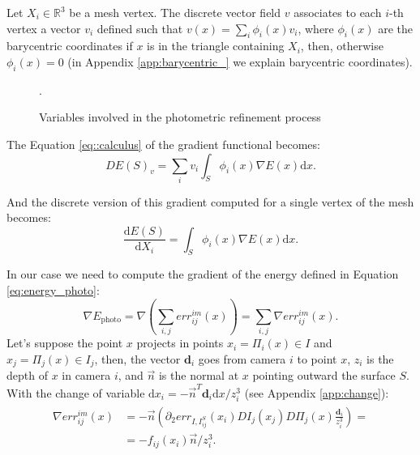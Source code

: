 Let $X_i \in \mathbb{R}^3$ be a mesh vertex. The discrete vector field $v$ associates to each $i$-th vertex a vector $v_i$ defined such that $v(x) = \sum_i \phi_i(x) v_i$, where $\phi_i(x)$ are the barycentric coordinates if $x$ is in the triangle containing $X_i$, then,  otherwise $\phi_i(x) = 0$ (in Appendix \ref{app:barycentric_} we explain barycentric coordinates).



\begin{figure}[t]
\centering
  \def\svgwidth{200pt}
  
\caption{Variables involved in the photometric refinement process}.
\label{fig:cameraproj}
\end{figure}

The Equation \eqref{eq::calculus} of the gradient functional becomes:
\begin{equation}
  DE(\mathit{S})_v = \sum_i v_i \int_{\mathit{S}} \phi_i(x) \nabla E(x) \textrm{d}x.
\end{equation}

And the discrete version of this gradient computed for a single vertex of the mesh becomes:
\begin{equation}
  \frac{\textrm{d}E(\mathit{S})}{\textrm{d}X_i} =  \int_{\mathit{S}} \phi_i(x) \nabla E(x) \textrm{d}x.
\end{equation}

In our case we need to compute the gradient of the energy defined in Equation \eqref{eq:energy_photo}:
\begin{equation}
  \nabla E_{\textrm{photo}} = \nabla (\sum_{i,j} err^{im}_{ij}(x)) = \sum_{i,j} \nabla err^{im}_{ij}(x).
\end{equation}
Let's suppose the point $x$ projects in points $x_i = \Pi_i(x) \in I$ and  $x_j = \Pi_j(x) \in I_j$, then, the vector $\mathbf{d}_i$ goes from camera $i$ to point $x$, $z_i$ is the depth of $x$ in camera $i$, and $\overrightarrow{n}$ is the normal at $x$ pointing outward the surface $\mathit{S}$. 
With the change of variable $\textrm{d}x_i = -\overrightarrow{n}^T \mathbf{d}_i \textrm{d}x/z_i^3$ (see Appendix \ref{app:change}):
\begin{align}
 \begin{split}
  \nabla err^{im}_{ij}(x)& =-\overrightarrow{n} \left( \partial_2 err_{I, I_{ij}^{\mathit{S}}}(x_i) DI_j(x_j) D\Pi_j(x)\frac{\mathbf{d}_i}{z_i^3}\right)=\\
  &= - f_{ij}(x_i) \overrightarrow{n}/z_i^3.
 \end{split}
\end{align}
    
